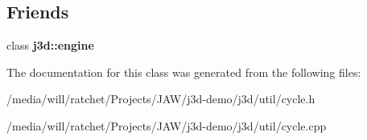 \subsection*{Friends}
\begin{DoxyCompactItemize}
\item 
\hypertarget{classj3d_1_1util_1_1cycle_a574ac12c3886b26b9da6eacbf4ad9a80}{}class {\bfseries j3d\+::engine}\label{classj3d_1_1util_1_1cycle_a574ac12c3886b26b9da6eacbf4ad9a80}

\end{DoxyCompactItemize}


The documentation for this class was generated from the following files\+:\begin{DoxyCompactItemize}
\item 
/media/will/ratchet/\+Projects/\+J\+A\+W/j3d-\/demo/j3d/util/cycle.\+h\item 
/media/will/ratchet/\+Projects/\+J\+A\+W/j3d-\/demo/j3d/util/cycle.\+cpp\end{DoxyCompactItemize}
